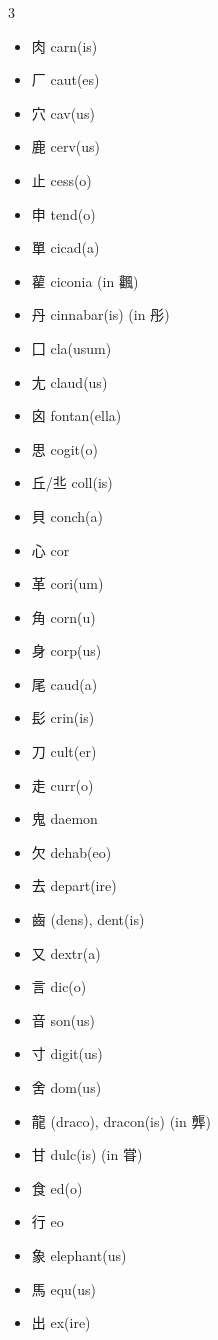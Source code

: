 \documentclass[xetex, svgnames, 12pt]{scrartcl}
\begin{document}
\begin{multicols}{3}
\begin{itemize}[noitemsep]
    \item 肉 carn(is) 
    \item 厂 caut(es)
    \item 穴 cav(us) 
    \item 鹿 cerv(us) 
    \item 止 cess(o)
    \item 申 tend(o)
    \item 單 cicad(a)
    \item 雚 ciconia (in 飌)
    \item 丹 cinnabar(is) (in 彤)
    \item 囗 cla(usum) 
    \item 尢 claud(us)
    \item 囟 fontan(ella)
    \item 思 
    cogit(o) 
    \item 丘/丠 coll(is)
    \item 貝 conch(a)
    \item 心 cor 
    \item 革 
    cori(um) 
    \item 角 corn(u) 
    \item 身 corp(us)
    \item 尾 caud(a)
    \item 髟 crin(is) 
    \item 刀 cult(er)
    \item 走 curr(o)     
    \item 鬼 daemon 
    \item 欠 dehab(eo)
    \item 去 depart(ire)
    \item 齒 (dens), dent(is)
    \item 又 dextr(a)
    \item 言 dic(o) 
    \item 音 son(us)
    \item 寸 digit(us)
    \item 舍 dom(us) 
    \item 龍 (draco), dracon(is) (in 龏)
    \item 甘 dulc(is) (in 甞)
    \item 食 ed(o) 
    \item 行 eo 
    \item 象 
    elephant(us) 
   \item 馬 equ(us)
   \item 出 ex(ire)

\end{itemize}
\end{multicols}
\end{document}
